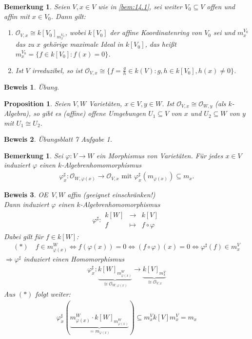 \documentclass[a4paper,12pt]{report}
\theoremstyle{break}
\newtheorem{Bem}[Def]{Bemerkung}
\newtheorem{Prop}[Def]{Proposition}
\theoremstyle{nonumberbreak}
\theoremstyle{nonumberplain}
\newtheorem{Bew}{Beweis}
\newcommand{\Abb}[5]{\ensuremath{#1:\begin{array}{ccc} #2 & \longrightarrow & #3 \\ #4 & \longmapsto & #5 \end{array}}}
\renewcommand{\OE}{O\!\!E}
\begin{document}
\begin{Bem}
  \label{bem:14.2}
  Seien $V,x\in V$ wie in \ref{bem:14.1}, sei weiter $V_0\subseteq V$ offen und affin mit $x\in V_0$. Dann gilt: 
  \begin{enumerate}
  \item $\mathcal{O}_{V,x}\cong k[V_0]_{m_x^{V_0}}$, wobei $k[V_0]$ der affine Koordinatenring von $V_0$
    sei und $m_x^{V_0}$ das zu $x$ gehörige maximale Ideal in $k[V_0]$, das heißt $m_x^{V_0}=\{f\in k[V_0]:f(x)=0\}$.
  \item Ist $V$ irreduzibel, so ist $\mathcal{O}_{V,x}\cong \{f=\frac{g}{h}\in k(V):g,h\in k[V_0], h(x)\neq 0\}$.
  \end{enumerate}
\end{Bem}
\begin{Bew}
  Übung.
\end{Bew}
\begin{Prop}
  \label{prop:14.3}
  Seien $V,W$ Varietäten, $x\in V, y\in W$. Ist $\mathcal{O}_{V,x}\cong\mathcal{O}_{W,y}$ (als $k$-Algebra), so gibt es (affine)
  offene Umgebungen $U_1\subseteq V$ von $x$ und $U_2\subseteq W$ von $y$ mit $U_1\cong U_2$.
\end{Prop}
\begin{Bew}
  Übungsblatt 7 Aufgabe 1.
\end{Bew}
\begin{Bem}
  \label{bem:14.4}
  Sei $\varphi :V\longrightarrow W$ ein Morphismus von Varietäten. Für jedes $x\in V$ induziert $\varphi$ einen
  $k$-Algebrenhomomorphismus
  \begin{align*}
    \varphi_x^\sharp:\mathcal{O}_{W,\varphi(x)}\longrightarrow \mathcal{O}_{V,x} \text{ mit } \varphi_x^\sharp(m_{\varphi(x)})\subseteq m_x.
  \end{align*}
\end{Bem}
\begin{Bew}
  \OE \ $V,W$ affin (geeignet einschränken!) \\ Dann induziert $\varphi$ einen $k$-Algebrenhomomorphismus
  \begin{align*}
    \Abb{\varphi^\sharp}{k[W]}{k[V]}{f}{f\circ\varphi}
  \end{align*}
  Dabei gilt für $f\in k[W]$:
  \begin{align*}
    (*) \quad f\in m_{\varphi(x)}^{W}\Leftrightarrow f(\varphi(x))=0\Leftrightarrow (f\circ\varphi)(x)=0\Leftrightarrow\varphi^\sharp(f)\in m_x^V
  \end{align*}
  $\Rightarrow\varphi^\sharp$ induziert einen Homomorphismus
  \begin{align*}
    \varphi_x^\sharp:\underbrace{k[W]_{m_{\varphi(x)}^W}}_{\cong\mathcal{O}_{W,\varphi(x)}}\longrightarrow \underbrace{k[V]_{m_x^V}}_{\cong\mathcal{O}_{V,x}}
  \end{align*}
  Aus $(*)$ folgt weiter:
  \begin{align*}
    \varphi_x^\sharp ( \underbrace{m_{\varphi(x)}^W\cdot k[W]_{m_{\varphi(x)}^W}}_{=m_{\varphi(x)}} ) \subseteq m_x^V k[V] m_x^V = m_x
  \end{align*}
\end{Bew}
\end{document}
